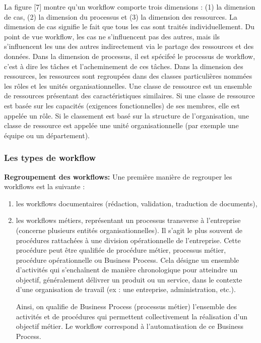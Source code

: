 La figure  [7] montre qu'un workflow comporte trois dimensions : (1) la dimension de cas, (2) la dimension du processus et (3) la dimension des ressources. La dimension de cas signifie le fait que tous les cas sont traités individuellement. Du point de vue workflow, les cas ne s'influencent pas des autres, mais ils s'influencent les uns des autres indirectement via le partage des ressources et des données. Dans la dimension de processus, il est spécifeé le processus de workflow, c'est à dire les tâches et l'acheminement de ces tâches. Dans la dimension des ressources, les ressources sont regroupées dans des classes particulières nommées les rôles et les unités organisationnelles. Une classe de ressource est un ensemble de ressources présentant des caractéristiques similaires. Si une classe de ressource est basée sur les capacités (exigences fonctionnelles) de ses membres, elle est appelée un rôle. Si le classement est basé sur la structure de l'organisation, une classe de ressource est appelée une unité organisationnelle (par exemple une équipe ou un département). 
\subsubsection{Les types de workflow}
\textbf{Regroupement des workflows:}
Une première manière de regrouper les workflows est la suivante :
\begin{enumerate}

	\item les workflows documentaires (rédaction, validation, traduction de documents),
	\item les workflows métiers, représentant un processus transverse à l'entreprise (concerne plusieurs entités organisationnelles). Il s'agit le plus souvent de procédures rattachées à une division opérationnelle de l'entreprise. Cette procédure peut être qualifiée de procédure métier, processus métier, procédure opérationnelle ou Business Process. Cela désigne un ensemble d'activités qui s'enchaînent de manière chronologique pour atteindre un objectif, généralement délivrer un produit ou un service, dans le contexte d'une organisation de travail (ex : une entreprise, administration, etc.).
	
	Ainsi, on qualifie de Business Process (processus métier) l'ensemble des activités et de procédures qui permettent collectivement la réalisation d'un objectif métier. Le workflow correspond à l'automatisation de ce Business Process.
	
	
\end{enumerate}

